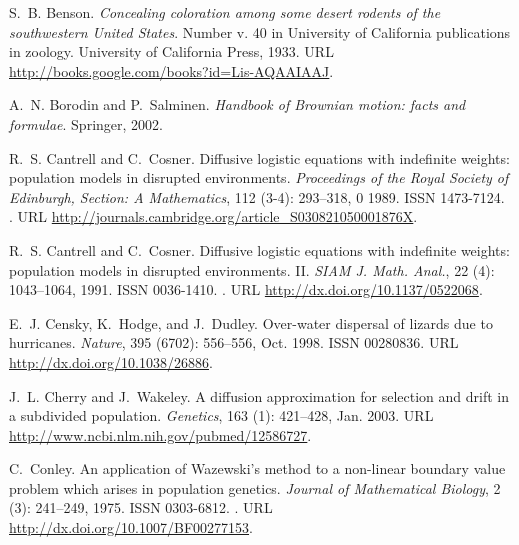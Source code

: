 \documentclass[10pt,letterpaper]{article}
\begin{document}
\begin{thebibliography}{68}
S.~B. Benson.
\newblock \emph{Concealing coloration among some desert rodents of the
  southwestern United States}.
\newblock Number v. 40 in University of California publications in zoology.
  University of California Press, 1933.
\newblock URL \url{http://books.google.com/books?id=Lis-AQAAIAAJ}.

A.~N. Borodin and P.~Salminen.
\newblock \emph{Handbook of Brownian motion: facts and formulae}.
\newblock Springer, 2002.

R.~S. Cantrell and C.~Cosner.
\newblock Diffusive logistic equations with indefinite weights: population
  models in disrupted environments.
\newblock \emph{Proceedings of the Royal Society of Edinburgh, Section: A
  Mathematics}, 112 (3-4): 293--318, 0 1989.
\newblock ISSN 1473-7124.
\newblock {}.
\newblock URL \url{http://journals.cambridge.org/article_S030821050001876X}.

R.~S. Cantrell and C.~Cosner.
\newblock Diffusive logistic equations with indefinite weights: population
  models in disrupted environments. {II}.
\newblock \emph{SIAM J. Math. Anal.}, 22 (4): 1043--1064,
  1991.
\newblock ISSN 0036-1410.
\newblock {}.
\newblock URL \url{http://dx.doi.org/10.1137/0522068}.

E.~J. Censky, K.~Hodge, and J.~Dudley.
\newblock Over-water dispersal of lizards due to hurricanes.
\newblock \emph{Nature}, 395 (6702): 556--556, Oct. 1998.
\newblock ISSN 00280836.
\newblock URL \url{http://dx.doi.org/10.1038/26886}.

J.~L. Cherry and J.~Wakeley.
\newblock A diffusion approximation for selection and drift in a subdivided
  population.
\newblock \emph{Genetics}, 163 (1): 421--428, Jan. 2003.
\newblock URL \url{http://www.ncbi.nlm.nih.gov/pubmed/12586727}.

C.~Conley.
\newblock An application of {Wazewski}'s method to a non-linear boundary value
  problem which arises in population genetics.
\newblock \emph{Journal of Mathematical Biology}, 2 (3):
  241--249, 1975.
\newblock ISSN 0303-6812.
\newblock {}.
\newblock URL \url{http://dx.doi.org/10.1007/BF00277153}.


\end{thebibliography}
\end{document}
